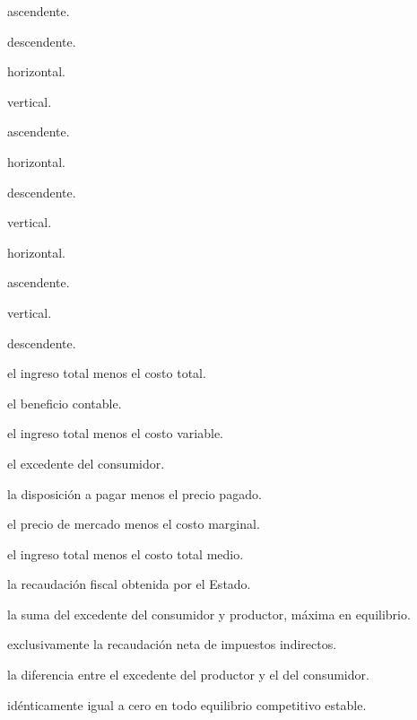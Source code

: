 \begin{opts}
    \item ascendente.
    \item descendente.
    \item horizontal.
    \item vertical.
\end{opts}

\begin{opts}
    \item ascendente.
    \item horizontal.
    \item descendente.
    \item vertical.
\end{opts}

\begin{opts}
    \item horizontal.
    \item ascendente.
    \item vertical.
    \item descendente.
\end{opts}

\begin{opts}
    \item el ingreso total menos el costo total.
    \item el beneficio contable.
    \item el ingreso total menos el costo variable.
    \item el excedente del consumidor.
\end{opts}

\begin{opts}
    \item la disposición a pagar menos el precio pagado.
    \item el precio de mercado menos el costo marginal.
    \item el ingreso total menos el costo total medio.
    \item la recaudación fiscal obtenida por el Estado.
\end{opts}

\begin{opts}
    \item la suma del excedente del consumidor y productor, máxima en equilibrio.
    \item exclusivamente la recaudación neta de impuestos indirectos.
    \item la diferencia entre el excedente del productor y el del consumidor.
    \item idénticamente igual a cero en todo equilibrio competitivo estable.
\end{opts}

